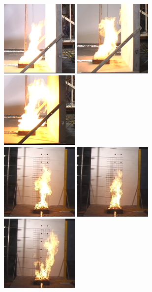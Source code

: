\documentclass[twoside]{uocthesis}
\begin{document}
{\begin{figure}[ht!]
  \centering
  \includegraphics[width=1.5in]{../Figures/IWGB_NG_Side1}
  \includegraphics[width=1.5in]{../Figures/IWGB_NG_Side2} 
  \includegraphics[width=1.5in]{../Figures/IWGB_NG_Side3}       \\
 \vspace{5mm}                                                             
  \includegraphics[width=1.5in]{../Figures/IWGB_NG_Front1}   
  \includegraphics[width=1.5in]{../Figures/IWGB_NG_Front2}     
  \includegraphics[width=1.5in]{../Figures/IWGB_NG_Front3}      \\

\end{figure}}
\end{document}
